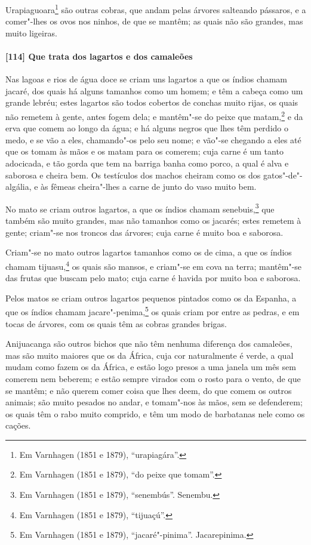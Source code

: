 \begin{linenumbers}
Urapiaguoara\footnote{ Em Varnhagen (1851 e 1879), ``urapiagára''.} são outras cobras, que
andam pelas árvores salteando pássaros, e a comer"-lhes os ovos nos ninhos, de que se
mantêm; as quais não são grandes, mas muito ligeiras.

\paragraph{[114] Que trata dos lagartos e dos camaleões}\quad
Nas lagoas e rios de água doce se criam uns lagartos a que os índios chamam jacaré, dos
quais há alguns tamanhos como um homem; e têm a cabeça como um grande lebréu; estes
lagartos são todos cobertos de conchas muito rijas, os quais não remetem à gente, antes
fogem dela; e mantêm"-se do peixe que matam,\footnote{ Em Varnhagen (1851 e 1879), ``do
peixe que tomam''.} e da erva que comem ao longo da água; e há alguns negros que lhes têm
perdido o medo, e se vão a eles, chamando"-os pelo seu nome; e vão"-se chegando a eles até
que os tomam às mãos e os matam para os comerem; cuja carne é um tanto adocicada, e tão
gorda que tem na barriga banha como porco, a qual é alva e saborosa e cheira bem. Os
testículos dos machos cheiram como os dos gatos"-de"-algália, e às fêmeas cheira"-lhes a
carne de junto do vaso muito bem.

No mato se criam outros lagartos, a que os índios chamam senebuis,\footnote{ Em Varnhagen
(1851 e 1879), ``senembús''. Senembu.} que também são muito grandes, mas não tamanhos
como os jacarés; estes remetem à gente; criam"-se nos troncos das árvores; cuja carne é
muito boa e saborosa.

Criam"-se no mato outros lagartos tamanhos como os de cima, a que os índios chamam
tijuasu,\footnote{ Em Varnhagen (1851 e 1879), ``tijuaçú''.} os quais são mansos, e
criam"-se em cova na terra; mantêm"-se das frutas que buscam pelo mato; cuja carne é havida
por muito boa e saborosa.

Pelos matos se criam outros lagartos pequenos pintados como os da Espanha, a que os índios
chamam jacare"-penima,\footnote{ Em Varnhagen (1851 e 1879), ``jacaré"-pinima''.
Jacarepinima.} os quais criam por entre as pedras, e em tocas de árvores, com os quais
têm as cobras grandes brigas.

Anijuacanga são outros bichos que não têm nenhuma diferença dos camaleões, mas são muito
maiores que os da África, cuja cor naturalmente é verde, a qual mudam como fazem os da
África, e estão logo presos a uma janela um mês sem comerem nem beberem; e estão sempre
virados com o rosto para o vento, de que se mantêm; e não querem comer coisa que lhes
deem, do que comem os outros animais; são muito pesados no andar, e tomam"-nos às mãos, sem
se defenderem; os quais têm o rabo muito comprido, e têm um modo de barbatanas nele como
os cações.


\end{linenumbers}
